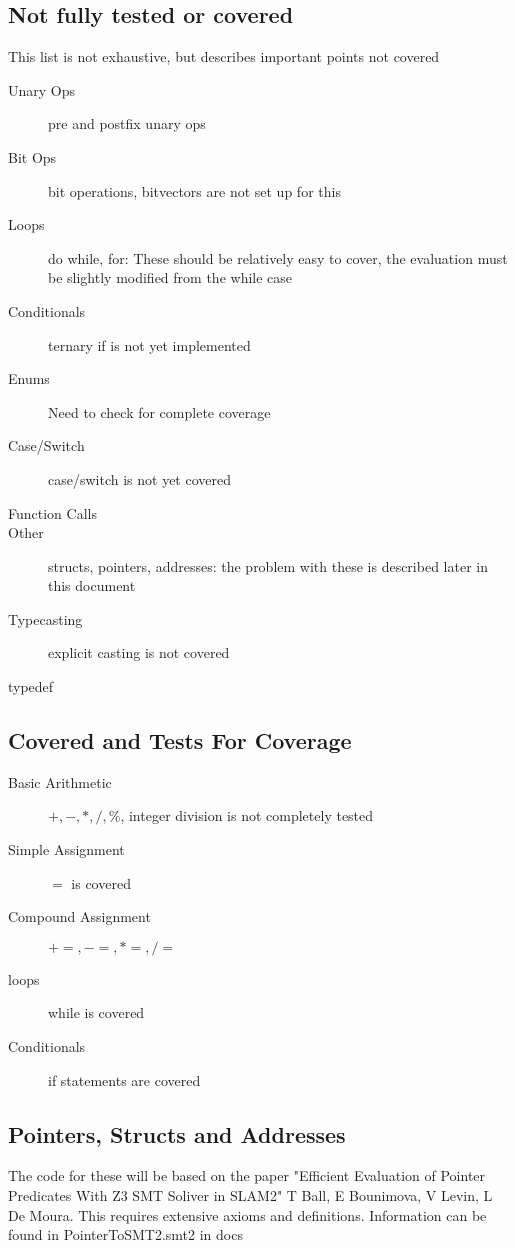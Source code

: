 \documentclass[11pt]{article}
\begin{document}
\subsection{Not fully tested or covered}
This list is not exhaustive, but describes important points not covered
\begin{description}
\item[Unary Ops] pre and postfix unary ops
\item[Bit Ops] bit operations, bitvectors are not set up for this
\item[Loops] do while, for: These should be relatively easy to cover, the evaluation must be slightly modified from the while case
\item[Conditionals] ternary if is not yet implemented
\item[Enums] Need to check for complete coverage
\item[Case/Switch] case/switch is not yet covered
\item[Function Calls]
\item[Other] structs, pointers, addresses: the problem with these is described later in this document
\item[Typecasting] explicit casting is not covered
\item[typedef]
\end{description}

\subsection{Covered and Tests For Coverage}
\begin{description}
\item[Basic Arithmetic] $+,-,*,/,\%$, integer division is not completely tested
\item[Simple Assignment] $=$ is covered
\item[Compound Assignment] $+=,-=,*=,/=$
\item[loops] while is covered
\item[Conditionals] if statements are covered

\end{description}

\subsection{Pointers, Structs and Addresses}
The code for these will be based on the paper "Efficient Evaluation of Pointer Predicates With Z3 SMT Soliver in SLAM2" T Ball, E Bounimova, V Levin, L De Moura. This requires extensive axioms and definitions. Information can be found in PointerToSMT2.smt2 in docs
\end{document}
